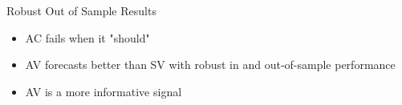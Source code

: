 \documentclass{beamer}
\begin{document}
\begin{frame}{Robust Out of Sample Results}
\begin{table}
					\end{table}
					\begin{itemize}[<+->]
						\item AC fails when it "should"
						\item AV forecasts better than SV with robust in and out-of-sample performance
						\item AV is a more informative signal
					\end{itemize}
				\end{frame}
\end{document}
